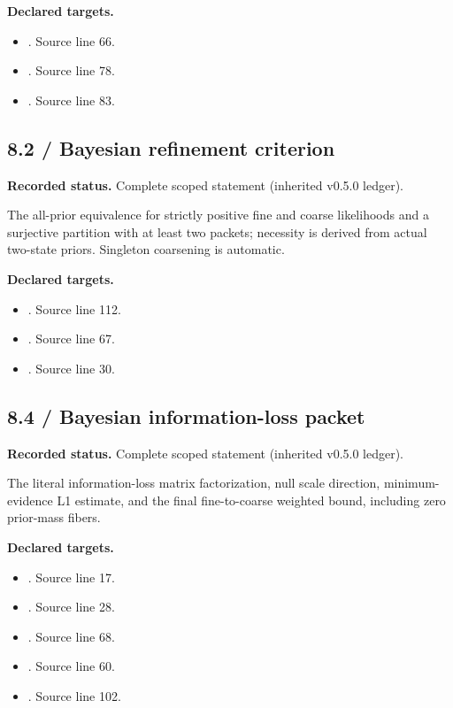 \textbf{Declared targets.}\begin{itemize}
\item {}. Source line 66.
\item {}. Source line 78.
\item {}. Source line 83.
\end{itemize}
\subsection{8.2 / Bayesian refinement criterion}
\label{result:8.2}
\textbf{Recorded status.} Complete scoped statement (inherited v0.5.0 ledger).\par
The all-prior equivalence for strictly positive fine and coarse likelihoods and a surjective partition with at least two packets; necessity is derived from actual two-state priors. Singleton coarsening is automatic.

\textbf{Declared targets.}\begin{itemize}
\item {}. Source line 112.
\item {}. Source line 67.
\item {}. Source line 30.
\end{itemize}
\subsection{8.4 / Bayesian information-loss packet}
\label{result:8.4}
\textbf{Recorded status.} Complete scoped statement (inherited v0.5.0 ledger).\par
The literal information-loss matrix factorization, null scale direction, minimum-evidence L1 estimate, and the final fine-to-coarse weighted bound, including zero prior-mass fibers.

\textbf{Declared targets.}\begin{itemize}
\item {}. Source line 17.
\item {}. Source line 28.
\item {}. Source line 68.
\item {}. Source line 60.
\item {}. Source line 102.
\end{itemize}
